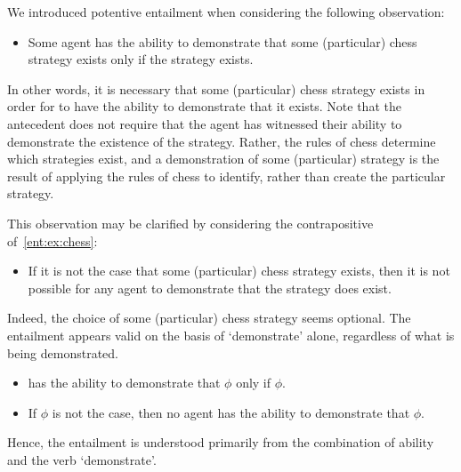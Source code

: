 \begin{note}[Previous]
  We introduced potentive entailment when considering the following observation:
  \begin{itemize}
  \item\label{ent:ex:chess} Some agent \agent{} has the ability to demonstrate that some (particular) chess strategy exists only if the strategy exists.
  \end{itemize}
  In other words, it is necessary that some (particular) chess strategy exists in order for \agent{} to have the ability to demonstrate that it exists.
  Note that the antecedent does not require that the agent has witnessed their ability to demonstrate the existence of the strategy.
  Rather, the rules of chess determine which strategies exist, and a demonstration of some (particular) strategy is the result of applying the rules of chess to identify, rather than create the particular strategy.
\end{note}

\begin{note}
  This observation may be clarified by considering the contrapositive of~\ref{ent:ex:chess}:
  \begin{itemize}
  \item\label{ent:ex:chess:cont} If it is not the case that some (particular) chess strategy exists, then it is not possible for any agent to demonstrate that the strategy does exist.
  \end{itemize}

  Indeed, the choice of some (particular) chess strategy seems optional.
  The entailment appears valid on the basis of `demonstrate' alone, regardless of what is being demonstrated.
  \begin{itemize}
  \item\label{ent:ex:chess:var} \agent{} has the ability to demonstrate that \(\phi\) only if \(\phi\).
  \item\label{ent:ex:chess:var:cont} If \(\phi\) is not the case, then no agent has the ability to demonstrate that \(\phi\).
  \end{itemize}
  Hence, the entailment is understood primarily from the combination of ability and the verb `demonstrate'.
\end{note}

